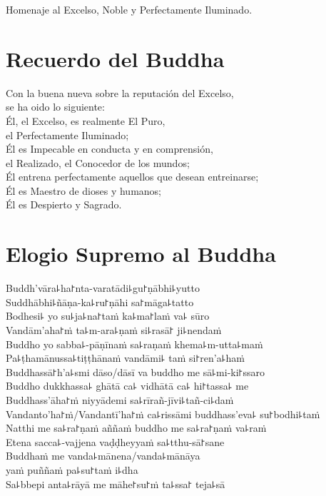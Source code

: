 Homenaje al Excelso, Noble y Perfectamente Iluminado.


\nextChapterUseDelegatedPageNumber

\chapter{Recuerdo del Buddha}

\begin{leader}
\end{leader}

Con la buena nueva sobre la reputación del Excelso,\\
\vin se ha oido lo siguiente:\\
Él, el Excelso, es realmente El Puro,\\
\vin el Perfectamente Iluminado;\\
Él es Impecable en conducta y en comprensión,\\
\vin el Realizado, el Conocedor de los mundos;\\
Él entrena perfectamente aquellos que desean entreinarse;\\
Él es Maestro de dioses y humanos;\\
Él es Despierto y Sagrado.

\clearpage

\chapter*{Elogio Supremo al Buddha}

\delegateSetUseNext

\begin{leader}
\end{leader}

Buddh'vāra꜕ha꜓nta-varatādi꜕gu꜓ṇābhi꜕yutto\\
Suddhābhi꜕ñāṇa-ka꜕ru꜓ṇāhi sa꜓māga꜕tatto\\
Bodhesi꜕ yo su꜕ja꜕na꜓taṁ ka꜕ma꜓laṁ va꜕ sūro\\
Vandām'aha꜓ṁ ta꜕m-ara꜕ṇaṁ si꜕rasā꜓ ji꜕nendaṁ\\
Buddho yo sabba꜕-pāṇīnaṁ sa꜕raṇaṁ khema꜕m-utta꜕maṁ\\
Pa꜕ṭhamānussa꜕tiṭṭhānaṁ vandāmi꜕ taṁ si꜓ren'a꜕haṁ\\
Buddhassā꜓h'a꜕smi dāso/dāsī va buddho me sā꜕mi-ki꜓ssaro\\
Buddho dukkhassa꜕ ghātā ca꜕ vidhātā ca꜕ hi꜓tassa꜕ me\\
Buddhass'āha꜓ṁ niyyādemi sa꜕rīrañ-jīvi꜕tañ-ci꜕daṁ\\
Vandanto'ha꜓ṁ/Vandantī'ha꜓ṁ ca꜕rissāmi buddhass'eva꜕ su꜓bodhi꜕taṁ\\
Natthi me sa꜕ra꜓ṇaṁ aññaṁ buddho me sa꜕ra꜓ṇaṁ va꜕raṁ\\
Etena sacca꜕-vajjena vaḍḍheyyaṁ sa꜕tthu-sā꜓sane\\
Buddhaṁ me vanda꜕mānena/vanda꜕mānāya\\
\vin yaṁ puññaṁ pa꜕su꜓taṁ i꜕dha\\
Sa꜕bbepi anta꜕rāyā me māhe꜓su꜓ṁ ta꜕ssa꜓ teja꜕sā

